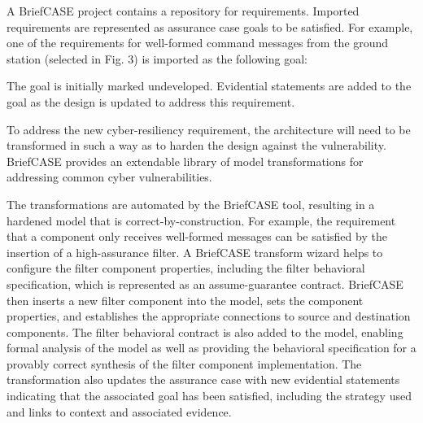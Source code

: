 A BriefCASE project contains a repository for requirements. Imported requirements are represented as assurance case goals to be satisfied. For example, one of the requirements for well-formed command messages from the ground station (selected in Fig. 3) is imported as the following goal:

The goal is initially marked undeveloped.  Evidential statements are added to the goal as the design is updated to address this requirement.

To address the new cyber-resiliency requirement, the architecture will need to be transformed in such a way as to harden the design against the vulnerability. BriefCASE provides an extendable library of model transformations for addressing common cyber vulnerabilities. 

%

The transformations are automated by the BriefCASE tool, resulting in a hardened model that is correct-by-construction. 
For example, the requirement that a component only receives well-formed messages can be satisfied by the insertion of a high-assurance filter. A BriefCASE transform wizard helps to configure the filter component properties, including the filter behavioral specification, which is represented as an assume-guarantee contract. BriefCASE then inserts a new filter component into the model, sets the component properties, and establishes the appropriate connections to source and destination components. The filter behavioral contract is also added to the model, enabling formal analysis of the model as well as providing the behavioral specification for a provably correct synthesis of the filter component implementation. 
The transformation also updates the assurance case with new evidential statements indicating that the associated goal has been satisfied, including the strategy used and links to context and
associated evidence.

